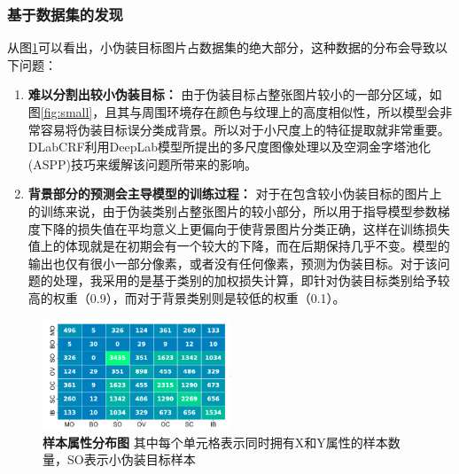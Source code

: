 \documentclass[a4paper,12pt]{ctexart}
\begin{document}
\subsubsection{基于数据集的发现}
从图\ref{fig:small_dist}可以看出，小伪装目标图片占数据集的绝大部分，这种数据的分布会导致以下问题：
\begin{enumerate}
    \item \textbf{难以分割出较小伪装目标：} 由于伪装目标占整张图片较小的一部分区域，如图\ref{fig:small}，且其与周围环境存在颜色与纹理上的高度相似性，所以模型会非常容易将伪装目标误分类成背景。所以对于小尺度上的特征提取就非常重要。DLabCRF利用DeepLab模型所提出的多尺度图像处理以及空洞金字塔池化(ASPP)技巧来缓解该问题所带来的影响。
	\item \textbf{背景部分的预测会主导模型的训练过程：} 对于在包含较小伪装目标的图片上的训练来说，由于伪装类别占整张图片的较小部分，所以用于指导模型参数梯度下降的损失值在平均意义上更偏向于使背景图片分类正确，这样在训练损失值上的体现就是在初期会有一个较大的下降，而在后期保持几乎不变。模型的输出也仅有很小一部分像素，或者没有任何像素，预测为伪装目标。对于该问题的处理，我采用的是基于类别的加权损失计算，即针对伪装目标类别给予较高的权重（0.9），而对于背景类别则是较低的权重（0.1）。
\end{enumerate}

\begin{figure}
    
    \centering
    \includegraphics[width=0.5\textwidth]{figures/small_dist.png}
    \caption{\textbf{样本属性分布图} 其中每个单元格表示同时拥有X和Y属性的样本数量，SO表示小伪装目标样本\label{fig:small_dist}}
\end{figure}
\end{document}
